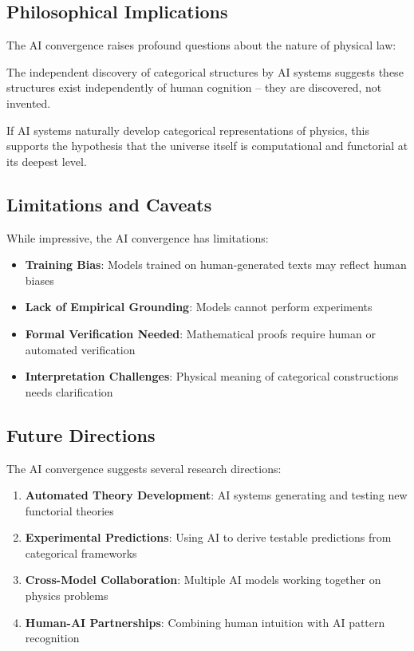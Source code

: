 \subsection{Philosophical Implications}

The AI convergence raises profound questions about the nature of physical law:

\begin{remark}
The independent discovery of categorical structures by AI systems suggests these structures exist independently of human cognition -- they are discovered, not invented.
\end{remark}

\begin{remark}
If AI systems naturally develop categorical representations of physics, this supports the hypothesis that the universe itself is computational and functorial at its deepest level.
\end{remark}

\subsection{Limitations and Caveats}

While impressive, the AI convergence has limitations:

\begin{itemize}[leftmargin=*]
\item \textbf{Training Bias}: Models trained on human-generated texts may reflect human biases
\item \textbf{Lack of Empirical Grounding}: Models cannot perform experiments
\item \textbf{Formal Verification Needed}: Mathematical proofs require human or automated verification
\item \textbf{Interpretation Challenges}: Physical meaning of categorical constructions needs clarification
\end{itemize}

\subsection{Future Directions}

The AI convergence suggests several research directions:

\begin{enumerate}[leftmargin=*]
\item \textbf{Automated Theory Development}: AI systems generating and testing new functorial theories
\item \textbf{Experimental Predictions}: Using AI to derive testable predictions from categorical frameworks
\item \textbf{Cross-Model Collaboration}: Multiple AI models working together on physics problems
\item \textbf{Human-AI Partnerships}: Combining human intuition with AI pattern recognition
\end{enumerate}

